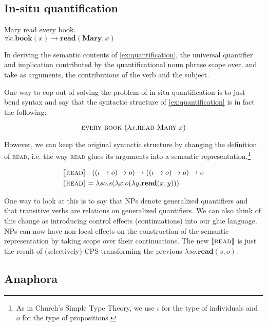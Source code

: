 \documentclass{article}
\newcommand{\sem}[1]{\llbracket #1 \rrbracket}
\begin{document}
\subsection{In-situ quantification}

\begin{exe}
  \ex \label{ex:quantification} Mary read every book. \\
  $\forall x. \textbf{book}(x) \to \textbf{read}(\textbf{Mary}, x)$
\end{exe}

In deriving the semantic contents of \eqref{ex:quantification}, the universal
quantifier and implication contributed by the quantificational noun phrase
scope over, and take as arguments, the contributions of the verb and the
subject.

One way to cop out of solving the problem of in-situ quantification is to just
bend syntax and say that the syntactic structure of \eqref{ex:quantification}
is in fact the following:

$$
\textsc{every} \ \textsc{book} \ (\lambda x. \textsc{read} \ \textsc{Mary} \ x)
$$

However, we can keep the original syntactic structure by changing the
definition of \textsc{read}, i.e. the way \textsc{read} glues its arguments
into a semantic representation.\footnote{As in Church's Simple Type Theory, we
  use $\iota$ for the type of individuals and $o$ for the type of
  propositions.}

\begin{align*}
  \sem{\textsc{read}} & : ((\iota \to o) \to o) \to ((\iota \to o) \to o) \to
  o \\
  \sem{\textsc{read}} & = \lambda s o. s (\lambda x. o (\lambda
  y. \textbf{read}(x, y)))
\end{align*}

One way to look at this is to say that NPs denote generalized quantifiers and
that transitive verbs are relations on generalized quantifiers. We can also
think of this change as introducing control effects (continuations) into our
glue language. NPs can now have non-local effects on the construction of the
semantic representation by taking scope over their continuations. The new
$\sem{\textsc{read}}$ is just the result of (selectively) CPS-transforming the
previous $\lambda s o. \textbf{read}(s, o)$.

\subsection{Anaphora}
\end{document}
